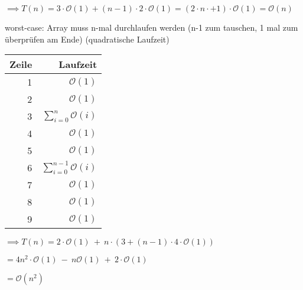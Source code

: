 \documentclass[ngerman,landscape,twocolumn]{adtexsheet}
\begin{document}
\begin{question}
\begin{enumerate}
            $\implies T(n) = 3 \cdot \mathcal{O}(1) + (n - 1) \cdot 2 \cdot \mathcal{O}(1) = (2 \cdot n \cdot + 1) \cdot \mathcal{O}(1) = \mathcal{O}(n)$
            
            worst-case: Array muss n-mal durchlaufen werden (n-1 zum tauschen, 1 mal zum überprüfen am Ende) (quadratische Laufzeit)
    
            \begin{tabular}{r|r}
            Zeile & Laufzeit  \\ \hline
            1  & $\mathcal{O}(1)$ \\
            2  & $\mathcal{O}(1)$ \\
            3  & $\sum_{i=0}^{n} \mathcal{O}(i)$ \\
            4  & $\mathcal{O}(1)$ \\
            5  & $\mathcal{O}(1)$ \\
            6  & $\sum_{i=0}^{n-1} \mathcal{O}(i)$ \\
            7  & $\mathcal{O}(1)$ \\
            8  & $\mathcal{O}(1)$ \\
            9  & $\mathcal{O}(1)$ \\
            \end{tabular}           
            
            $\implies T(n) = 2 \cdot \mathcal{O}(1) \:+\: n \cdot (3 + (n - 1) \cdot 4 \cdot \mathcal{O}(1))$
            
            $= 4n^2 \cdot \mathcal{O}(1) \:-\: n \mathcal{O}(1) \:+\: 2 \cdot \mathcal{O}(1)$
            
            $= \mathcal{O}(n^2)$
            
		\end{enumerate}
	\end{question}

	\newpage
\end{document}
